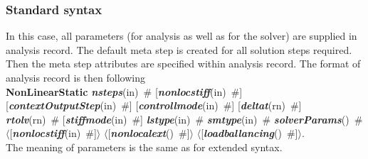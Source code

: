 \documentclass[draft]{article}
\newcommand{\keywordnotype}[1]{\mbox{{\it{\bf{#1}}}}}
\newcommand{\keyword}[2]{\mbox{{\keywordnotype{#1}\tiny (#2)}}}
\newcommand{\entKeywordInst}[1]{\mbox{{\bf{{#1}}}}}
\newcommand{\field}[2]{\mbox{\keyword{#1}{#2}~\#}}
\newcommand{\optField}[2]{\mbox{[\field{#1}{#2}]}}
\newcommand{\PoptField}[2]{\mbox{$\langle$[\field{#1}{#2}]$\rangle$}}
\begin{document}
\subsubsection{Standard syntax}
In this case, all parameters (for analysis as well as for the solver)
are supplied in analysis record. The default meta step is created for
all solution steps required. Then the meta step attributes are
specified within analysis record. The format of analysis record is
then following\\
\entKeywordInst{NonLinearStatic} \field{nsteps}{in}
\optField{nonlocstiff}{in}\\
 \optField{contextOutputStep}{in} \optField{controllmode}{in} \optField{deltat}{rn}\\
\field{rtolv}{rn} \optField{stiffmode}{in} \field{lstype}{in}
\field{smtype}{in} \field{solverParams}{}\\
\PoptField{nonlocstiff}{in} \PoptField{nonlocalext}{} \PoptField{loadballancing}{}.\\ The
meaning of parameters is the same as for extended syntax.

%
\end{document}
